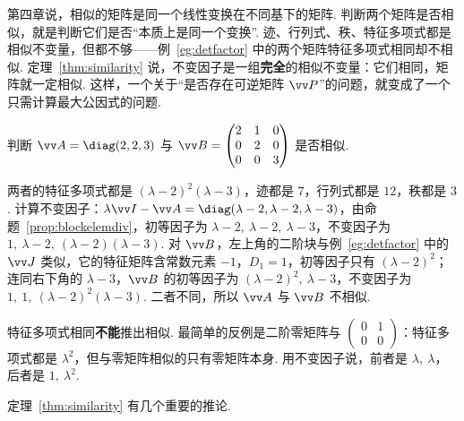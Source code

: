 	\begin{motivebox}
		第四章说，相似的矩阵是同一个线性变换在不同基下的矩阵. 判断两个矩阵是否相似，就是判断它们是否“本质上是同一个变换”. 迹、行列式、秩、特征多项式都是相似不变量，但都不够——例~\ref{eg:detfactor} 中的两个矩阵特征多项式相同却不相似. 定理~\ref{thm:similarity} 说，不变因子是一组\textbf{完全}的相似不变量：它们相同，矩阵就一定相似. 这样，一个关于“是否存在可逆矩阵 $\vv P$”的问题，就变成了一个只需计算最大公因式的问题.
	\end{motivebox}
	
	\begin{example}
		判断 $\vv A=\diag(2,2,3)$ 与 $\vv B=\begin{pmatrix}2&1&0\\0&2&0\\0&0&3\end{pmatrix}$ 是否相似.
	\end{example}
	\begin{solution}
		两者的特征多项式都是 $(\lambda-2)^2(\lambda-3)$，迹都是 $7$，行列式都是 $12$，秩都是 $3$. 计算不变因子：$\lambda\vv I-\vv A=\diag(\lambda-2,\lambda-2,\lambda-3)$，由命题~\ref{prop:blockelemdiv}，初等因子为 $\lambda-2,\ \lambda-2,\ \lambda-3$，不变因子为 $1,\ \lambda-2,\ (\lambda-2)(\lambda-3)$. 对 $\vv B$，左上角的二阶块与例~\ref{eg:detfactor} 中的 $\vv J$ 类似，它的特征矩阵含常数元素 $-1$，$D_1=1$，初等因子只有 $(\lambda-2)^2$；连同右下角的 $\lambda-3$，$\vv B$ 的初等因子为 $(\lambda-2)^2,\ \lambda-3$，不变因子为 $1,\ 1,\ (\lambda-2)^2(\lambda-3)$. 二者不同，所以 $\vv A$ 与 $\vv B$ 不相似.
	\end{solution}
	
	\begin{pitfallbox}
		特征多项式相同\textbf{不能}推出相似. 最简单的反例是二阶零矩阵与 $\begin{pmatrix}0&1\\0&0\end{pmatrix}$：特征多项式都是 $\lambda^2$，但与零矩阵相似的只有零矩阵本身. 用不变因子说，前者是 $\lambda,\ \lambda$，后者是 $1,\ \lambda^2$.
	\end{pitfallbox}
	
	定理~\ref{thm:similarity} 有几个重要的推论.
	
